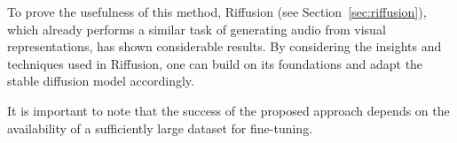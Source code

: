 To prove the usefulness of this method, Riffusion (see Section~\ref{sec:riffusion}), which already performs a similar task of generating audio from visual representations, has shown considerable results. By considering the insights and techniques used in Riffusion, one can build on its foundations and adapt the stable diffusion model accordingly.

It is important to note that the success of the proposed approach depends on the availability of a sufficiently large dataset for fine-tuning.
